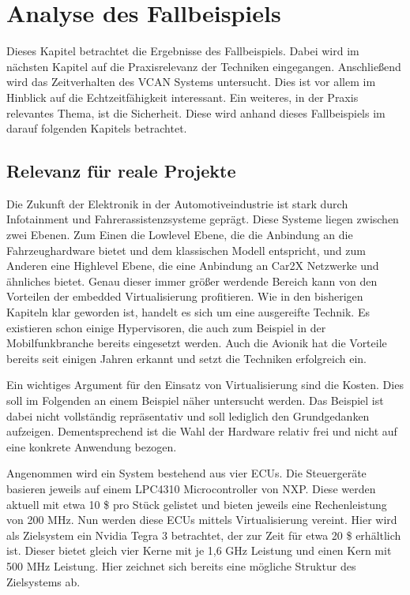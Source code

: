 \documentclass[
  a4paper,					    %
  twoside,
  DIV=calc,     				%
  bibliography=totoc,
  cleardoublepage=empty,
  ngerman,     					%
  final       					%
]{scrbook}
\begin{document}
\chapter{Analyse des Fallbeispiels}
\label{sec:Beispiel_Analyse}
Dieses Kapitel betrachtet die Ergebnisse des Fallbeispiels. Dabei wird im nächsten Kapitel auf die Praxisrelevanz der Techniken eingegangen. Anschließend wird das Zeitverhalten des VCAN Systems untersucht. Dies ist vor allem im Hinblick auf die Echtzeitfähigkeit interessant. Ein weiteres, in der Praxis relevantes Thema, ist die Sicherheit. Diese wird anhand dieses Fallbeispiels im darauf folgenden Kapitels betrachtet.



\section{Relevanz für reale Projekte}
\label{sec:Relevanz}
Die Zukunft der Elektronik in der Automotiveindustrie ist stark durch Infotainment und Fahrerassistenzsysteme geprägt. Diese Systeme liegen zwischen zwei Ebenen. Zum Einen die Lowlevel Ebene, die die Anbindung an die Fahrzeughardware bietet und dem klassischen Modell entspricht, und zum Anderen eine Highlevel Ebene, die eine Anbindung an Car2X Netzwerke und ähnliches bietet. Genau dieser immer größer werdende Bereich kann von den Vorteilen der embedded Virtualisierung profitieren. Wie in den bisherigen Kapiteln klar geworden ist, handelt es sich um eine ausgereifte Technik. Es existieren schon einige Hypervisoren, die auch zum Beispiel in der Mobilfunkbranche bereits eingesetzt werden. Auch die Avionik hat die Vorteile bereits seit einigen Jahren erkannt und setzt die Techniken erfolgreich ein.

Ein wichtiges Argument für den Einsatz von Virtualisierung sind die Kosten. Dies soll im Folgenden an einem Beispiel näher untersucht werden. Das Beispiel ist dabei nicht vollständig repräsentativ und soll lediglich den Grundgedanken aufzeigen. Dementsprechend ist die Wahl der Hardware relativ frei und nicht auf eine konkrete Anwendung bezogen.

Angenommen wird ein System bestehend aus vier ECUs. Die Steuergeräte basieren jeweils auf einem LPC4310 Microcontroller von NXP. Diese werden aktuell mit etwa 10 \$ pro Stück gelistet und bieten jeweils eine Rechenleistung von 200 MHz. Nun werden diese ECUs mittels Virtualisierung vereint. Hier wird als Zielsystem ein Nvidia Tegra 3 betrachtet, der zur Zeit für etwa 20 \$ erhältlich ist. Dieser bietet gleich vier Kerne mit je 1,6 GHz Leistung und einen Kern mit 500 MHz Leistung. Hier zeichnet sich bereits eine mögliche Struktur des Zielsystems ab. 
\end{document}
